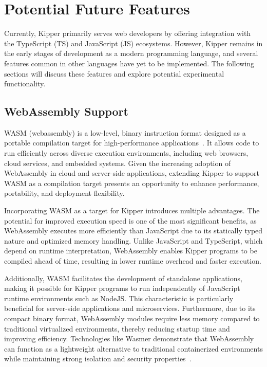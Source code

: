 \section{Potential Future Features}

Currently, Kipper primarily serves web developers by offering integration with the TypeScript (TS) and JavaScript (JS) ecosystems. However, Kipper remains in the early stages of development as a modern programming language, and several features common in other languages have yet to be implemented. The following sections will discuss these features and explore potential experimental functionality.

\subsection{WebAssembly Support}

WASM (\Gls{webassembly}) is a low-level, binary instruction format designed as a portable compilation target for high-performance applications~\cite{webassembly}. It allows code to run efficiently across diverse execution environments, including web browsers, cloud services, and embedded systems. Given the increasing adoption of WebAssembly in cloud and server-side applications, extending Kipper to support WASM as a compilation target presents an opportunity to enhance performance, portability, and deployment flexibility.

Incorporating WASM as a target for Kipper introduces multiple advantages. The potential for improved execution speed is one of the most significant benefits, as WebAssembly executes more efficiently than JavaScript due to its statically typed nature and optimized memory handling. Unlike JavaScript and TypeScript, which depend on runtime interpretation, WebAssembly enables Kipper programs to be compiled ahead of time, resulting in lower runtime overhead and faster execution.

Additionally, WASM facilitates the development of standalone applications, making it possible for Kipper programs to run independently of JavaScript runtime environments such as NodeJS. This characteristic is particularly beneficial for server-side applications and microservices. Furthermore, due to its compact binary format, WebAssembly modules require less memory compared to traditional virtualized environments, thereby reducing startup time and improving efficiency. Technologies like Wasmer demonstrate that WebAssembly can function as a lightweight alternative to traditional containerized environments while maintaining strong isolation and security properties~\cite{wasmer}.

